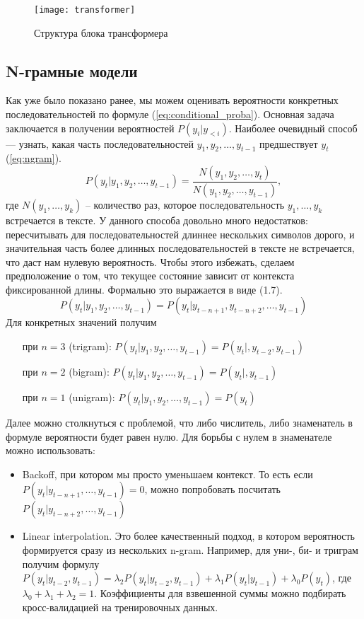 \begin{figure}[ht]
	\centering
	\texttt{[image: transformer]}  
	\caption{ Структура блока трансформера}
	\label{fig:transformer}
\end{figure}

\subsection{N-грамные модели}
\label{sub:domain:n_gram}

Как уже было показано ранее, мы можем оценивать вероятности конкретных последовательностей по формуле (\ref{eq:conditional_proba}). Основная задача заключается в получении вероятностей $P(y_i|y_{<i})$. Наиболее очевидный способ --- узнать, какая часть последовательностей $y_1, y_2,\dots, y_{t-1}$ предшествует $y_t$ (\ref{eq:ngram}).
\begin{equation}
	P(y_t|y_1,y_2,\dots,y_{t-1}) = \frac{N(y_1,y_2,\dots,y_t)}{N(y_1,y_2,\dots,y_{t-1})},
	\label{eq:ngram}
\end{equation} где $N(y_1,\dots,y_k)$ -- количество раз, которое последовательность $y_1,\dots,y_k$ встречается в тексте. У данного способа довольно много недостатков: пересчитывать для последовательностей длиннее нескольких символов дорого, и значительная часть более длинных последовательностей в тексте не встречается, что даст нам нулевую вероятность. Чтобы этого избежать, сделаем предположение о том, что текущее состояние зависит от контекста фиксированной длины. Формально это выражается в виде (1.7).
\begin{equation}
	P(y_t|y_1,y_2,\dots,y_{t-1}) = P(y_t|y_{t-n+1}, y_{t-n+2},\dots,y_{t-1})
\end{equation}
Для конкретных значений получим
\begin{itemize}
	\item[при] $n = 3$ (trigram): $P(y_t|y_1,y_2,\dots,y_{t-1}) = P(y_t|, y_{t-2},y_{t-1})$
	\item[при] $n = 2$ (bigram): $P(y_t|y_1,y_2,\dots,y_{t-1}) = P(y_t|, y_{t-1})$
	\item[при] $n = 1$ (unigram): $P(y_t|y_1,y_2,\dots,y_{t-1}) = P(y_t)$
\end{itemize}

Далее можно столкнуться с проблемой, что либо числитель, либо знаменатель в формуле вероятности будет равен нулю. Для борьбы с нулем в знаменателе можно использовать:

\begin{itemize}
	\item Backoff, при котором мы просто уменьшаем контекст. То есть если $P(y_t|y_{t-n+1},\dots,y_{t-1}) = 0$, можно попробовать посчитать $P(y_t|y_{t-n+2},\dots,y_{t-1})$
	\item Linear interpolation. Это более качественный подход, в котором вероятность формируется сразу из нескольких n-gram. Например, для уни-, би- и триграм получим формулу $P(y_t|y_{t-2}, y_{t-1}) = \lambda_2P(y_t|y_{t-2}, y_{t-1}) + \lambda_1P(y_t|y_{t-1}) + \lambda_0P(y_t)$, где $\lambda_0 + \lambda_1 + \lambda_2 = 1$. Коэффициенты для взвешенной суммы можно подбирать кросс-валидацией на тренировочных данных.
\end{itemize}


